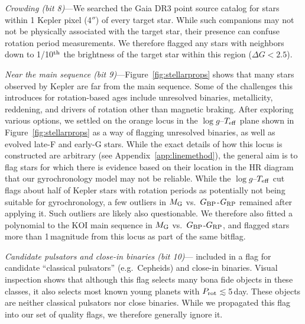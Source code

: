 \documentclass[11pt,twocolumn,tighten,linenumbers]{aastex63}
\begin{document}
{\it Crowding (bit 8)}---We searched the Gaia DR3 point source catalog
for stars within 1 Kepler pixel (4$''$) of every target star.  While
such companions may not not be physically associated with the target
star, their presence can confuse rotation period measurements.  We
therefore flagged any stars with neighbors down to 1/10$^{\rm th}$ the
brightness of the target star within this region ($\Delta G < 2.5$).

{\it Near the main sequence (bit 9)}---Figure~\ref{fig:stellarprops} shows
that many stars observed by Kepler
are far from the main sequence.  Some of the challenges this introduces
for rotation-based ages include unresolved binaries, metallicity,
reddening, and drivers of rotation other than magnetic braking.
After exploring various options, we settled on the orange locus in the
$\log g$--$T_{\rm eff}$ plane shown in Figure~\ref{fig:stellarprops}
as a way of flagging unresolved binaries, as well as evolved
late-F and early-G stars.  While the exact details of how this locus
is constructed are arbitrary (see Appendix~\ref{app:linemethod}), the
general aim is to flag stars for which there is evidence based on
their location in the HR diagram that our gyrochronology model may not
be reliable.  While the $\log g$--$T_{\rm eff}$ cut flags about half
of Kepler stars with rotation periods as potentially not being
suitable for gyrochronology, a few outliers in $M_{\rm G}$ vs.~$G_{\rm
BP}$-$G_{\rm RP}$ remained after applying it.  Such outliers are
likely also questionable.  We therefore also fitted a polynomial to
the KOI main sequence in $M_{\rm G}$ vs.~$G_{\rm
	BP}$-$G_{\rm RP}$, and flagged stars more than 1\,magnitude from
this locus as part of the same bitflag.



{\it Candidate pulsators and close-in binaries (bit
10)}---\citeauthor{Santos_2021} included in a flag for candidate
``classical pulsators'' (e.g.\ Cepheids) and close-in binaries.
Visual inspection shows that although this flag selects many bona fide
objects in these classes, it also selects most known young planets
with $P_{\rm rot}$$\lesssim$5\,day.  These objects are
neither classical pulsators nor close binaries.  While we propagated
this flag into our set of quality flags, we therefore generally ignore
it.
\end{document}
